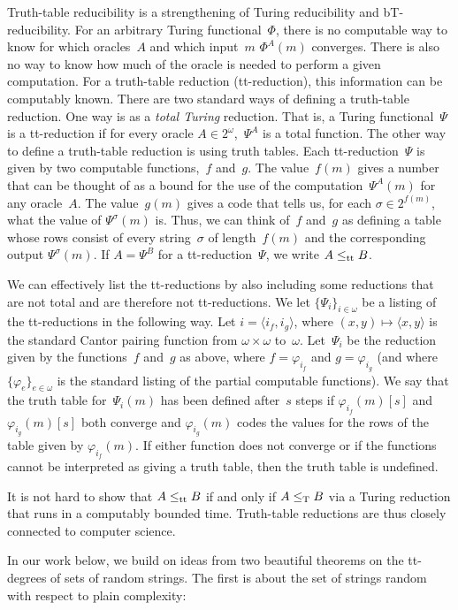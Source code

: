 \documentclass{LMCS}
\def\phi{\varphi}
\newcommand{\0}{\mathbf{0}}
\newcommand\leT{\leq_{\rm T}}
\newcommand{\lett}{\leq_{\rm {tt}}}
\newcommand{\<}{\langle}
\renewcommand{\>}{\rangle}
\begin{document}
Truth-table reducibility is a strengthening of Turing reducibility and
bT-reduci\-bi\-lity.  For an arbitrary Turing functional~$\Phi$, there is no
computable way to know for which oracles~$A$ and which input~$m$ $\Phi^A(m)$
converges.  There is also no way to know how much of the oracle is needed to
perform a given computation.  For a truth-table reduction (tt-reduction),
this information can be computably known.  There are two standard ways of
defining a truth-table reduction.  One way is as a {\em total Turing}
reduction.  That is, a Turing functional~$\Psi$ is a tt-reduction if for
every oracle $A\in 2^\omega$,~$\Psi^A$ is a total function.  The other way to
define a truth-table reduction is using truth tables.  Each
tt-reduction~$\Psi$ is given by two computable functions,~$f$ and~$g$.  The
value~$f(m)$ gives a number that can be thought of as a bound for the use of
the computation~$\Psi^A(m)$ for any oracle~$A$. The value~$g(m)$ gives a code
that tells us, for each $\sigma\in 2^{f(m)}$, what the value of
$\Psi^\sigma(m)$ is.  Thus, we can think of~$f$ and~$g$ as defining a table
whose rows consist of every string~$\sigma$ of length~$f(m)$ and the
corresponding output $\Psi^\sigma(m)$.  If $A=\Psi^B$ for a
tt-reduction~$\Psi$, we write $A\lett B$.

We can effectively list the tt-reductions by also including some reductions
that are not total and are therefore not tt-reductions.  We let
$\{\Psi_i\}_{i\in \omega}$ be a listing of the tt-reductions in the following
way.  Let $i=\langle i_f, i_g\rangle$, where $(x,y) \mapsto \langle
x,y\rangle$ is the standard Cantor pairing function from $\omega\times
\omega$ to~$\omega$. Let~$\Psi_i$ be the reduction given by the functions~$f$
and~$g$ as above, where $f=\phi_{i_f}$ and $g=\phi_{i_g}$ (and where
$\{\phi_e\}_{e\in\omega}$ is the standard listing of the partial computable
functions).  We say that the truth table for~$\Psi_i(m)$ has been defined
after~$s$ steps if $\phi_{i_f}(m)[s]$ and $\phi_{i_g}(m)[s]$ both converge
and $\phi_{i_g}(m)$ codes the values for the rows of the table given by
$\phi_{i_f}(m)$.  If either function does not converge or if the functions
cannot be interpreted as giving a truth table, then the truth table is
undefined.

It is not hard to show that $A\lett B$ if and only if $A\leT B$ via a Turing
reduction that runs in a computably bounded time.  Truth-table reductions are
thus closely connected to computer science.


In our work below, we build on ideas from two beautiful theorems on the
tt-degrees of sets of random strings. The first is about the set of strings
random with respect to plain complexity:
\end{document}

